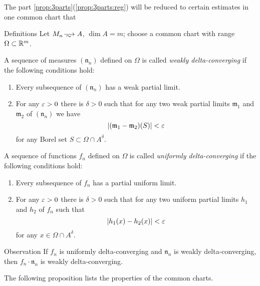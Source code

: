 The part \ref{prop:3parts}(\ref{prop:3parts:reg}) will be reduced to certain estimates in one common chart that

\begin{thm}{Definitions}\label{def:delta-converge}
Let $M_n\smooths{} A$, $\dim A=m$;
choose a common chart with range $\Omega\subset \mathbb{R}^m$.

A sequence of measures $(\mathfrak n_n)$ defined on $\Omega$ is called \emph{weakly delta-converging}
if the following conditions hold:
\begin{enumerate}
 \item Every subsequence of $(\mathfrak n_n)$ has a weak partial limit.
 \item For any $\varepsilon>0$ there is $\delta>0$ such that for any two weak partial limits $\mathfrak m_1$ and $\mathfrak m_2$ of $(\mathfrak n_n)$ we have  
\[|(\mathfrak m_1-\mathfrak m_2)(S)|<\varepsilon\]
for any Borel set $S\subset \Omega\cap A^\delta$.
\end{enumerate}

A sequence of functions $f_n$ defined on $\Omega$ is called \emph{uniformly delta-converging}
if the following conditions hold:
\begin{enumerate}
 \item Every subsequence of $f_n$ has a partial uniform limit.
 \item For any $\varepsilon>0$ there is $\delta>0$ such that for any two uniform partial limits $h_1$ and $h_2$ of $f_n$  such that 
\[|h_1(x)-h_2(x)|<  \varepsilon\]
for any $x\in \Omega\cap A^\delta$.
\end{enumerate}

\end{thm}

\begin{thm}{Observation}\label{obs:delta-weak-uniform}
If $f_n$ is uniformly delta-converging and $\mathfrak n_n$ is weakly delta-converging,
then $f_n\cdot \mathfrak n_n$ is weakly delta-converging.
\end{thm}





The following proposition lists the properties of the common charts.

